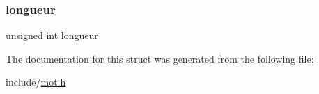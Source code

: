 \mbox{\label{struct_m___mot_a3dfad5cc5d44b479f0e42df8df2ae5d9}} 
\subsubsection{\texorpdfstring{longueur}{longueur}}
{\footnotesize\ttfamily unsigned int longueur}



The documentation for this struct was generated from the following file\+:\begin{DoxyCompactItemize}
\item 
include/\hyperlink{mot_8h}{mot.\+h}\end{DoxyCompactItemize}
